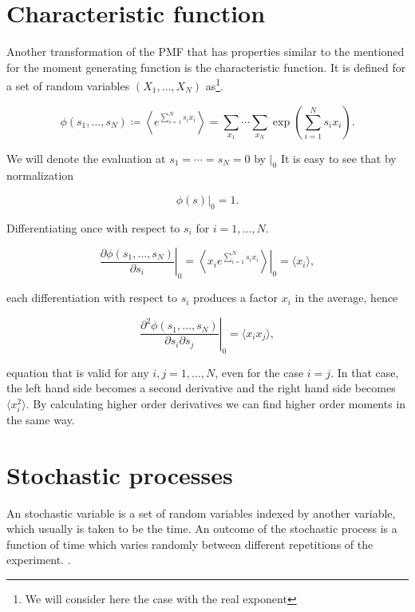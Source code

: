 \section{Characteristic function}

Another transformation of the PMF that has properties similar to the mentioned for the moment generating function is the characteristic function. It is defined for a set of random variables $(X_1,\dotsc,X_N)$ as\footnote{We will consider here the case with the real exponent}.

\begin{equation}
  \phi(s_1,\dotsc,s_N)\coloneqq \left\langle e^{\sum_{i=1}^Ns_ix_i}\right\rangle = \sum_{x_1}\dotsi\sum_{x_N}\exp\left(\sum_{i=1}^Ns_ix_i\right).
\end{equation}

We will denote the evaluation at $s_1=\dotsb=s_N=0$ by $|_0$ It is easy to see that by normalization

\begin{equation}
  \phi(s)|_0 = 1.
\end{equation}

Differentiating once with respect to $s_i$ for $i=1,\dotsc,N$.

\begin{equation}
  \left.\frac{\partial\phi(s_1,\dotsc,s_N)}{\partial s_i}\right|_0 = \left.\left\langle x_i e^{\sum_{i=1}^Ns_ix_i}\right\rangle\right|_0 = \langle x_i\rangle,
\end{equation}

each differentiation with respect to $s_i$ produces a factor $x_i$ in the average, hence

\begin{equation}
  \left.\frac{\partial^2\phi(s_1,\dotsc,s_N)}{\partial s_i \partial s_j}\right|_0 = \langle x_ix_j\rangle,
\end{equation}

equation that is valid for any $i,j=1,\dotsc,N$, even for the case $i=j$. In that case, the left hand side becomes a second derivative and the right hand side becomes $\langle x_i^2\rangle$. By calculating higher order derivatives we can find higher order moments in the same way.
  
\section{Stochastic processes}

An stochastic variable is a set of random variables indexed by another variable, which usually is taken to be the time. An outcome of the stochastic process is a function of time which varies randomly between different repetitions of the experiment. \cite{vankampen92} \cite{gardiner03}.

